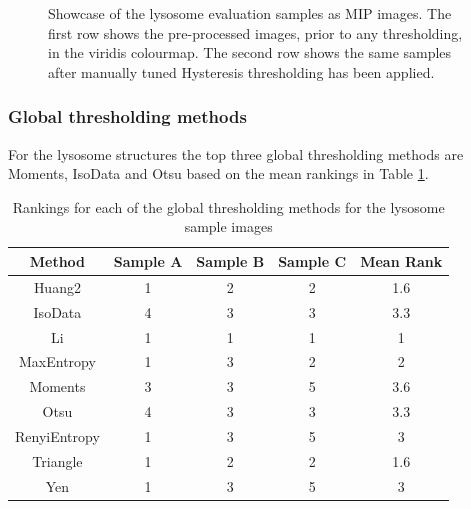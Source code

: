 \begin{figure}[ht!]
	\caption[Showcase of the lysosome evaluation samples as MIP images.]{Showcase of the lysosome evaluation samples as MIP images. The first row shows the pre-processed images, prior to any thresholding, in the viridis colourmap. The second row shows the same samples after manually tuned Hysteresis thresholding has been applied.}
	\label{fig:lysosome_raw}
\end{figure}
\FloatBarrier
\subsubsection{Global thresholding methods}
For the lysosome structures the top three global thresholding methods are Moments, IsoData and Otsu based on the mean rankings in Table \ref{tab:lyso_global_ranks}.
\begin{table}[hb!]
	\centering
	\begin{tabular}{|c|c|c|c|c|}
		\hline
		\textbf{Method} & \textbf{Sample A} & \textbf{Sample B} & \textbf{Sample C} & \textbf{Mean Rank} \\
		\hline
		Huang2 & 1 & 2 & 2 & 1.6 \\
		\hline
		IsoData & 4 & 3 & 3 & 3.3 \\
		\hline
		Li & 1 & 1 & 1 & 1 \\
		\hline
		MaxEntropy & 1 & 3 & 2 & 2 \\
		\hline
		Moments & 3 & 3 & 5 & 3.6 \\
		\hline
		Otsu & 4 & 3 & 3 & 3.3 \\
		\hline
		RenyiEntropy & 1 & 3 & 5 & 3 \\
		\hline
		Triangle & 1 & 2 & 2 & 1.6 \\
		\hline
		Yen & 1 & 3 & 5 & 3 \\
		\hline
	\end{tabular}
	\caption{Rankings for each of the global thresholding methods for the lysosome sample images}
	\label{tab:lyso_global_ranks}
\end{table}

